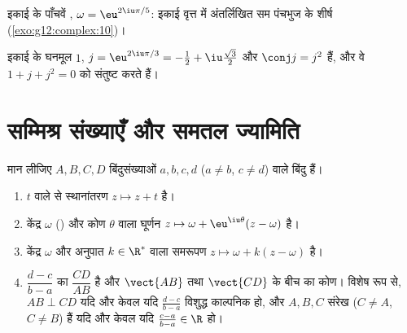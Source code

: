 \begin{omfigure}

{\small इकाई के पाँचवें , $\omega = \eu^{2\iu\pi/5}$: इकाई वृत्त में अंतर्लिखित सम पंचभुज के
शीर्ष (\cref{exo:g12:complex:10})।}
\end{omfigure}

\begin{example}
इकाई के घनमूल $1$, $j = \eu^{2\iu\pi/3} =
-\frac12 + \iu\frac{\sqrt3}{2}$ और $\conj j = j^2$ हैं, और वे $1 + j + j^2 = 0$ को संतुष्ट करते हैं।
\end{example}

\section{सम्मिश्र संख्याएँ और समतल ज्यामिति}

\begin{proposition}[ज्यामितीय शब्दकोश]\label{prop:g12:complex:geometry}
मान लीजिए $A, B, C, D$ बिंदुसंख्याओं $a, b, c, d$ ($a \neq b$, $c \neq d$) वाले बिंदु हैं।
\begin{enumerate}
  \item {} $t$ वाले  से स्थानांतरण $z \mapsto z + t$ है।
  \item केंद्र $\omega$ () और कोण $\theta$ वाला घूर्णन $z \mapsto \omega + \eu^{\iu\theta}(z - \omega)$ है।
  \item केंद्र $\omega$ और अनुपात $k \in \R^*$ वाला समरूपण $z \mapsto \omega + k(z - \omega)$ है।
  \item $\dfrac{d - c}{b - a}$ का  $\dfrac{CD}{AB}$ है और   $\vect{AB}$ तथा $\vect{CD}$ के बीच का
        कोण। विशेष रूप से, $AB \perp CD$ यदि और केवल यदि $\frac{d-c}{b-a}$ विशुद्ध काल्पनिक हो,
        और $A, B, C$ संरेख ($C \ne A$, $C\ne B$) हैं यदि और केवल यदि $\frac{c-a}{b-a} \in \R$ हो।
\end{enumerate}
\end{proposition}

